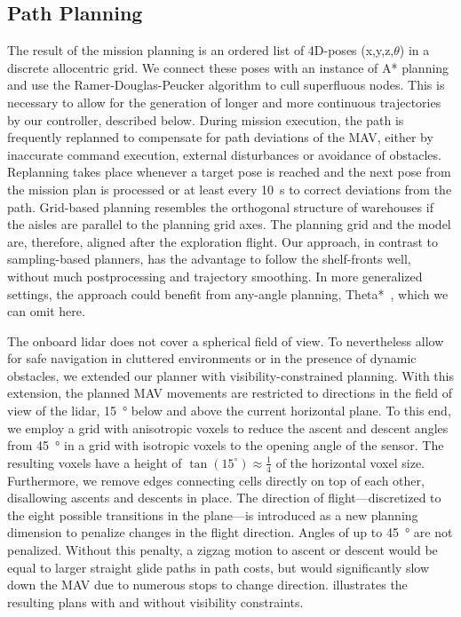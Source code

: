 \subsection{Path Planning}
\label{sec:Path_Planning}
The result of the mission planning is an ordered list of 4D-poses (x,y,z,$\theta$) in a discrete allocentric grid.
We connect these poses with an instance of A* planning and use the Ramer-Douglas-Peucker algorithm to cull superfluous nodes.
This is necessary to allow for the generation of longer and more continuous trajectories by our controller, described below.
During mission execution, the path is frequently replanned to compensate for path deviations of the MAV, either by inaccurate command execution, external disturbances or avoidance of obstacles.
Replanning takes place whenever a target pose is reached and the next pose from the mission plan is processed or at least every \SI{10}{\second} to correct deviations from the path.
Grid-based planning resembles the orthogonal structure of warehouses if the aisles are parallel to the planning grid axes.
The planning grid and the model are, therefore, aligned after the exploration flight.
Our approach, in contrast to sampling-based planners, has the advantage to follow the shelf-fronts well, without much postprocessing and trajectory smoothing.
In more generalized settings, the approach could benefit from any-angle planning, \eg Theta*~\cite{thetastar}, which we can omit here.

The onboard lidar does not cover a spherical field of view. To nevertheless allow for safe navigation in cluttered environments or in the presence of dynamic obstacles, we extended our planner with visibility-constrained planning.
With this extension, the planned MAV movements are restricted to directions in the field of view of the lidar, \ie \SI{15}{\degree} below and above the current horizontal plane.
To this end, we employ a grid with anisotropic voxels to reduce the ascent and descent angles from \SI{45}{\degree} in a grid with isotropic voxels to the opening angle of the sensor.
The resulting voxels have a height of $\tan (15^\circ) \approx \frac{1}{4}$ of the horizontal voxel size.
Furthermore, we remove edges connecting cells directly on top of each other, disallowing ascents and descents in place.
The direction of flight---discretized to the eight possible transitions in the plane---is introduced as a new planning dimension to penalize changes in the flight direction.
Angles of up to \SI{45}{\degree} are not penalized. Without this penalty, a zigzag motion to ascent or descent would be equal to larger straight glide paths in path costs, but would significantly slow down the MAV due to numerous stops to change direction.
 illustrates the resulting plans with and without visibility constraints.

